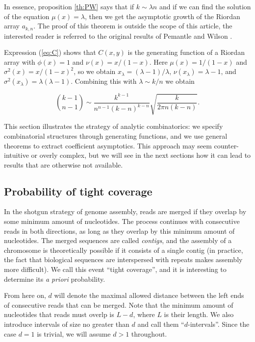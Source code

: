 \documentclass{article}
\begin{document}
In essence, proposition \ref{th:PW} says that if $k \sim \lambda n$ and if
we can find the solution of the equation $\mu(x) = \lambda$, then we get
the asymptotic growth of the Riordan array $a_{k,n}$. The proof of this
theorem is outside the scope of this article, the interested reader is
referred to the original results of Pemantle and Wilson
\cite{PemWil08,AnalComb2013}.

Expression (\ref{eq:C}) shows that $C(x,y)$ is the generating function of
a Riordan array with $\phi(x) = 1$ and $\nu(x) = x/(1-x)$.  Here $\mu(x) =
1/(1-x)$ and $\sigma^2(x) = x/(1-x)^2$, so we obtain $x_\lambda = (\lambda
-1)/\lambda$, $\nu(x_\lambda) = \lambda -1$, and $\sigma^2(x_\lambda) =
\lambda(\lambda-1)$. Combining this with $\lambda \sim k/n$ we obtain

\begin{equation}
\label{eq:assBC}
{k-1 \choose n-1} \sim \frac{k^{k-1}}{n^{n-1}(k-n)^{k-n}}
\sqrt{\frac{k}{2\pi n(k-n)}}.
\end{equation}

This section illustrates the strategy of analytic combinatorics: we
specify combinatorial structures through generating functions, and we use
general theorems to extract coefficient asymptotics. This approach may
seem counter-intuitive or overly complex, but we will see in the next
sections how it can lead to results that are otherwise not available. 

\subsection{Probability of tight coverage}
\label{sec:compass}

In the shotgun strategy of genome assembly, reads are merged if they
overlap by some minimum amount of nucleotides. The process continues with
consecutive reads in both directions, as long as they overlap by this
minimum amount of nucleotides. The merged sequences are called
\emph{contigs}, and the assembly of a chromosome is theoretically possible
if it consists of a single contig (in practice, the fact that biological
sequences are interspersed with repeats makes assembly more difficult). We
call this event ``tight coverage'', and it is interesting to determine
its \textit{a priori} probability.

From here on, $d$ will denote the maximal allowed distance between the
left ends of consecutive reads that can be merged. Note that the minimum
amount of nucleotides that reads must overlp is $L-d$, where $L$ is their
length. We also introduce intervals of size no greater than $d$ and call
them ``$d$-intervals''. Since the case $d=1$ is trivial, we will assume $d
> 1$ throughout.
\end{document}
